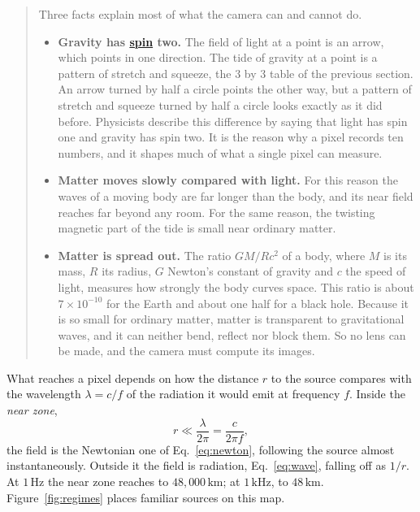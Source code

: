 \begin{quote}
Three facts explain most of what the camera can and cannot do.
\begin{itemize}
\item \textbf{Gravity has
\href{https://en.wikipedia.org/wiki/Spin_(physics)}{spin} two.} The field of
light at a point is an arrow, which points in one direction. The tide of
gravity at a point is a pattern of stretch and squeeze, the 3 by 3 table of the
previous section. An arrow turned by half a circle points the other way, but a
pattern of stretch and squeeze turned by half a circle looks exactly as it did
before. Physicists describe this difference by saying that light has spin one
and gravity has spin two. It is the reason why a pixel records ten numbers, and
it shapes much of what a single pixel can measure.
\item \textbf{Matter moves slowly compared with light.} For this reason the
waves of a moving body are far longer than the body, and its near field reaches
far beyond any room. For the same reason, the twisting magnetic part of the
tide is small near ordinary matter.
\item \textbf{Matter is spread out.} The ratio $GM/Rc^2$ of a body, where $M$ is
its mass, $R$ its radius, $G$ Newton's constant of gravity and $c$ the speed
of light, measures how strongly the body curves space. This ratio is about
$7\times10^{-10}$ for the Earth and about one half for a black hole. Because it
is so small for ordinary matter, matter is transparent to gravitational waves,
and it can neither bend, reflect nor block them. So no lens can be made, and the
camera must compute its images.
\end{itemize}
\end{quote}

What reaches a pixel depends on how the distance $r$ to the source compares
with the wavelength $\lambda = c/f$ of the radiation it would emit at frequency
$f$. Inside the \emph{near zone},
\begin{equation}\label{eq:nearzone}
r \ll \frac{\lambda}{2\pi} = \frac{c}{2\pi f},
\end{equation}
the field is the Newtonian one of Eq.~\eqref{eq:newton}, following the source
almost instantaneously. Outside it the field is radiation, Eq.~\eqref{eq:wave},
falling off as $1/r$. At $1\,\mathrm{Hz}$ the near zone reaches to
$48{,}000\,\mathrm{km}$; at $1\,\mathrm{kHz}$, to $48\,\mathrm{km}$.
Figure~\ref{fig:regimes} places familiar sources on this map.

